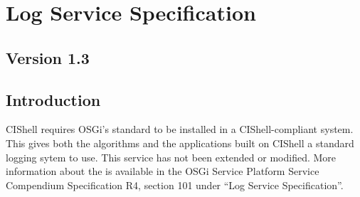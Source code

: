 \chapter{Log Service Specification}
\section*{Version 1.3}
\section{Introduction}

CIShell requires OSGi's standard  to be installed in a
CIShell-compliant system. This gives both the algorithms and the applications
built on CIShell a standard logging sytem to use. This service has not been
extended or modified. More information about the  is available
in the OSGi Service Platform Service Compendium Specification R4, section 101
under ``Log Service Specification''.


